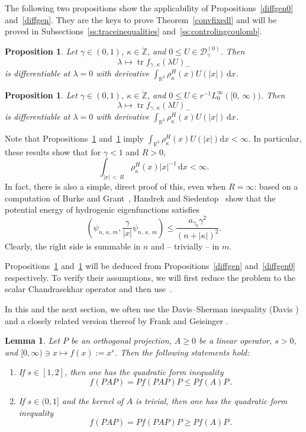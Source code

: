\documentclass[10pt]{amsart}
\newtheorem{prop}[cdrthm]{Proposition}
\newtheorem{lemm}[cdrthm]{Lemma}
\theoremstyle{definition}
\DeclareMathOperator{\tr}{tr}
\newcommand*\dx{\mathrm{d}x}
\newcommand*\gz{\mathbb{Z}}
\newcommand*\rz{\mathbb{R}}
\newcommand*\zp{\dot{\gz}}
\newcommand*\cD{\mathcal{D}}
\begin{document}
The following two propositions show the applicability of Propositions~\ref{diffgen0} and~\ref{diffgen}. They are the keys to prove Theorem~\ref{convfixedl} and will be proved in Subsections~\ref{ss:traceinequalities} and~\ref{ss:controlingcoulomb}.

\begin{prop}\label{diffu2}
Let $\gamma\in(0,1)$, $\kappa\in\zp$, and $0\leq U\in\cD_\gamma^{(0)}$. Then
\[
\lambda\mapsto \tr f_{\gamma,\,\kappa}(\lambda U)_-
\]
is differentiable at $\lambda=0$ with derivative $\int_{\rz^3}\rho_\kappa^H(x) U(|x|)\,\dx$.
\end{prop}

\begin{prop}\label{diffu1}
Let $\gamma\in(0,1)$, $\kappa\in\zp$, and $0\leq U \in r^{-1} L^\infty_0 ([0,\,\infty))$. Then
\[
\lambda\mapsto
\tr f_{\gamma,\,\kappa}(\lambda U)_-
\]
is differentiable at $\lambda=0$ with derivative $\int_{\rz^3} \rho_\kappa^H(x) U(|x|)\,\dx$.
\end{prop}

Note that Propositions~\ref{diffu2} and~\ref{diffu1} imply $\int_{\rz^3}\rho_\kappa^H(x)U(|x|)\dx<\infty$. In particular, these results show that for $\gamma<1$ and $R>0$,
\[
\int_{|x|\,<\,R} \rho_\kappa^H(x) |x|^{-1}\,\dx < \infty.
\]
In fact, there is also a simple, direct proof of this, even when $R=\infty$: based on a computation of Burke and Grant~\cite{BurkeGrant1967}, Handrek and Siedentop~\cite[Lemma~2]{HandrekSiedentop2015} show that the potential energy of hydrogenic eigenfunctions satisfies
\[
\left(\psi_{n,\,\kappa,\,m},\frac{\gamma}{|x|}\psi_{n,\,\kappa,\,m}\right)
\leq\frac{a_{\gamma_0}\gamma^2}{(n+|\kappa|)^2}.
\]
Clearly, the right side is summable in $n$ and -- trivially -- in $m$.

Propositions~\ref{diffu2} and~\ref{diffu1} will be deduced from Propositions~\ref{diffgen} and~\ref{diffgen0} respectively. To verify their assumptions, we will first reduce the problem to the scalar Chandrasekhar operator and then use~\cite{Franketal2020P}.

In this and the next section, we often use the Davis--Sherman inequality (Davis \cite{Davis1957}) and a closely related version thereof by Frank and Geisinger \cite[Lem\-ma~6.4]{FrankGeisinger2016}.

\begin{lemm}
Let $P$ be an orthogonal projection, $A\geq0$ be a linear operator, $s>0$, and $[0,\infty)\ni x\mapsto f(x):=x^s$. Then the following statements hold:
\begin{enumerate}
\item If $s\in[1,2]$, then one has the quadratic form inequality
\begin{equation}\label{eq:SD}
f(PAP) = Pf(PAP)P \leq Pf(A)P\,.
\end{equation}

\item If $s\in(0,1]$ and the kernel of $A$ is trivial, then one has the quadratic form inequality
\begin{equation}\label{eq:FG}
f(PAP) = Pf(PAP)P \geq Pf(A)P\,.
\end{equation}
\end{enumerate}
\end{lemm}
\end{document}
